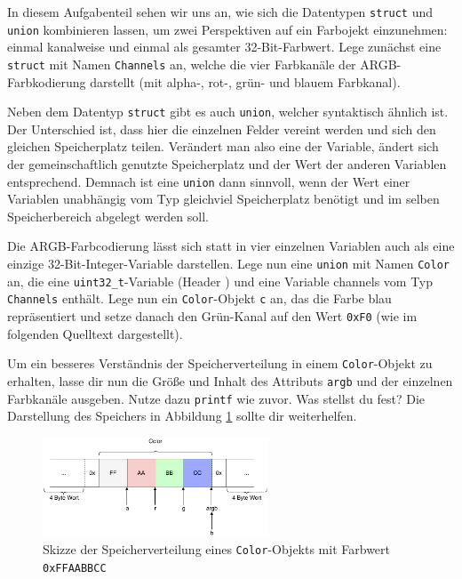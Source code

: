 \optionaltextbox

In diesem Aufgabenteil sehen wir uns an, wie sich die Datentypen \lstinline|struct| und \lstinline|union| kombinieren lassen, um zwei Perspektiven auf ein Farbojekt einzunehmen: einmal kanalweise und einmal als gesamter 32-Bit-Farbwert.
Lege zunächst eine \lstinline|struct| mit Namen \lstinline|Channels| an, welche die vier Farbkanäle der ARGB-Farbkodierung darstellt (mit alpha-, rot-, grün- und blauem Farbkanal). 



Neben dem Datentyp \lstinline|struct| gibt es auch \lstinline|union|, welcher syntaktisch ähnlich ist.
Der Unterschied ist, dass hier die einzelnen Felder vereint werden und sich den gleichen Speicherplatz teilen. 
Verändert man also eine der Variable, ändert sich der gemeinschaftlich genutzte Speicherplatz und der Wert der anderen Variablen entsprechend. 
Demnach ist eine \lstinline|union| dann sinnvoll, wenn der Wert einer Variablen unabhängig vom Typ gleichviel Speicherplatz benötigt und im selben Speicherbereich abgelegt werden soll.

Die ARGB-Farbcodierung lässt sich statt in vier einzelnen Variablen auch als eine einzige 32-Bit-Integer-Variable darstellen.
Lege nun eine \lstinline|union| mit Namen \lstinline|Color| an, die eine \lstinline|uint32_t|-Variable (Header ) und eine Variable channels vom Typ \lstinline|Channels| enthält.
Lege nun ein \lstinline|Color|-Objekt \lstinline|c| an, das die Farbe blau repräsentiert und setze danach den Grün-Kanal auf den Wert \lstinline|0xF0| (wie im folgenden Quelltext dargestellt).


Um ein besseres Verständnis der Speicherverteilung in einem \lstinline|Color|-Objekt zu erhalten, lasse dir nun die Größe und Inhalt des Attributs \lstinline|argb| und der einzelnen Farbkanäle ausgeben.
Nutze dazu \lstinline{printf} wie zuvor. 
Was stellst du fest? 
Die Darstellung des Speichers in Abbildung \ref{fig:color_channels} sollte dir weiterhelfen.

\begin{figure}[!htb]
	\centering
	\includegraphics[width=0.6\textwidth]{./05_c/figures/Color_Channels.pdf}
	\caption{Skizze der Speicherverteilung eines \lstinline|Color|-Objekts mit Farbwert \lstinline|0xFFAABBCC|}
	\label{fig:color_channels}
\end{figure} 

